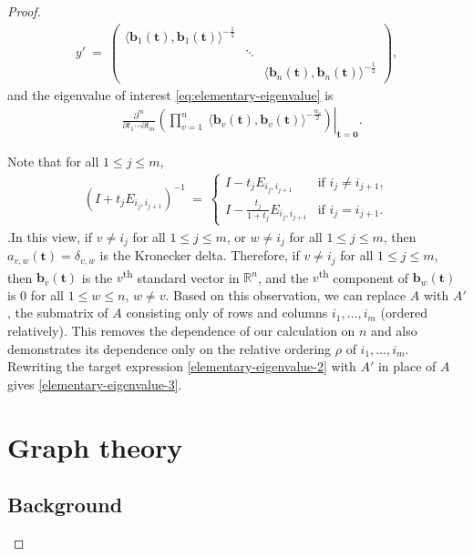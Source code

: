 \documentclass[12pt, reqno, oneside]{amsart}
\numberwithin{equation}{section}
\begin{document}
\begin{proof}
\begin{align}\label{eq:diagonal-matrix}
y' \ = \ 
\begin{pmatrix}
\langle \mathbf{b}_1(\mathbf{t}), \mathbf{b}_1(\mathbf{t}) \rangle^{-\frac{1}{2}} & & \\
& \ddots & \\
& & \langle \mathbf{b}_n(\mathbf{t}), \mathbf{b}_n(\mathbf{t}) \rangle^{-\frac{1}{2}} 
\end{pmatrix},
\end{align}
and the eigenvalue of interest \eqref{eq:elementary-eigenvalue} is
\begin{align}\label{elementary-eigenvalue-2}
&\left.\frac{\partial^m}{\partial t_1\cdots\partial t_m}\left(\prod_{v=1}^n \ \langle \mathbf{b}_v(\mathbf{t}) ,\mathbf{b}_v(\mathbf{t}) \rangle^{-\frac{\alpha_v}{2}}\right)\right\rvert_{\mathbf{t}=\mathbf{0}}.
\end{align}

Note that for all $1 \leq j \leq m$, 
\begin{align}
(I+t_jE_{i_j,i_{j+1}})^{-1} \ = \ 
\begin{cases}
I - t_j E_{i_j,i_{j+1}} & \text{if } i_j \neq i_{j+1}, \\
I - \frac{t_j}{1+t_j} E_{i_j,i_{j+1}} & \text{if } i_j = i_{j+1}.
\end{cases}
\end{align}
.In this view, if $v\neq i_j$ for all $1 \leq j \leq m$, or $w\neq i_j$ for all $1 \leq j \leq m$, then $a_{v,w}(\mathbf{t})=\delta_{v,w}$ is the Kronecker delta. Therefore, if $v \neq i_j$ for all $1 \leq j \leq m$, then $\mathbf{b}_v(\mathbf{t})$ is the $v$\textsuperscript{th} standard vector in $\mathbb{R}^n$, and the $v$\textsuperscript{th} component of $\mathbf{b}_w(\mathbf{t})$ is $0$ for all $1 \leq w \leq n$, $w \neq v$. Based on this observation, we can replace $A$ with $A'$, the submatrix of $A$ consisting only of rows and columns $i_1,\dots,i_m$ (ordered relatively). This removes the dependence of our calculation on $n$ and also demonstrates its dependence only on the relative ordering $\rho$ of $i_1, \dots, i_m$. Rewriting the target expression \eqref{elementary-eigenvalue-2} with $A'$ in place of $A$ gives \eqref{elementary-eigenvalue-3}.

\section{Graph theory}\label{sec:graph-theory}

\subsection{Background}


\end{proof}
\end{document}
